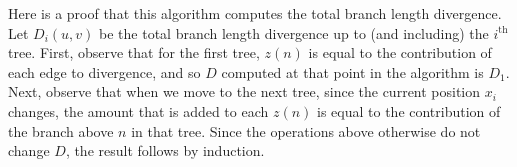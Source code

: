 Here is a proof that this algorithm computes the total branch length divergence.
%
Let $D_i(u, v)$ be the total branch length divergence up to (and including) the $i^\text{th}$ tree.
%
First, observe that for the first tree, $z(n)$ is equal to the contribution of each edge to divergence,
and so $D$ computed at that point in the algorithm is $D_1$.
%
Next, observe that when we move to the next tree,
since the current position $x_i$ changes, the amount that is added to each $z(n)$ is equal to 
the contribution of the branch above $n$ in that tree.
%
Since the operations above otherwise do not change $D$,
the result follows by induction.
